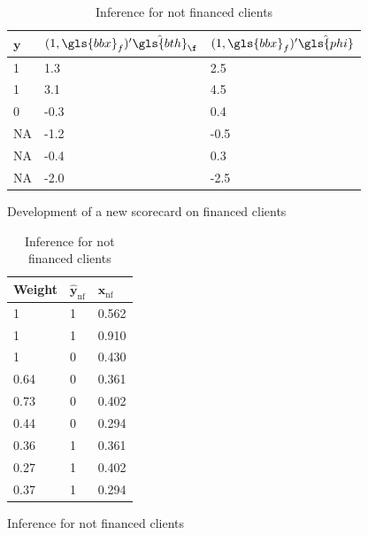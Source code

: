 \begin{table}
{\begin{multicols}{4}
\begin{subfigure}[t]{0.22\textwidth}
\begin{center}
\begin{adjustbox}{max width=0.95\textwidth}
\begin{tabular}{l l l}
\toprule
\textbf{${\bm{y}}$} & \textbf{$(1,\gls{bbx}_f)' \hat{\gls{bth}}_\f$} & \textbf{$(1,\gls{bbx}_f)' \hat{\gls{phi}}$}\\
\midrule
1 & 1.3 & 2.5\\
1 & 3.1 & 4.5 \\
0 & -0.3 & 0.4 \\
NA & -1.2 & -0.5 \\
NA & -0.4 & 0.3 \\
NA & -2.0 & -2.5 \\
\bottomrule
\end{tabular}
\end{adjustbox}
\end{center}

\caption{Development of a new scorecard on financed clients}
\label{twins:sfig3}
\end{subfigure}

\columnbreak

\begin{subfigure}[t]{0.22\textwidth}
\begin{center}
\begin{adjustbox}{max width=0.95\textwidth}
\begin{tabular}{l l l}
\toprule
\textbf{Weight} & \textbf{$\hat{\bm{y}}_{\text{nf}}$} & \textbf{${\bm{x}}_{\text{nf}}$}\\
\midrule
1 & 1 & 0.562 \\
1 & 1 & 0.910 \\
1 & 0 & 0.430 \\
0.64 & 0 & 0.361 \\
0.73 & 0 & 0.402 \\
0.44 & 0 & 0.294 \\
0.36 & 1 & 0.361 \\
0.27 & 1 & 0.402 \\
0.37 & 1 & 0.294 \\
\bottomrule
\end{tabular}
\end{adjustbox}
\end{center}

\caption{Inference for not financed clients}
\label{twins:sfig4}
\end{subfigure}

\end{multicols}
}
\end{table}

